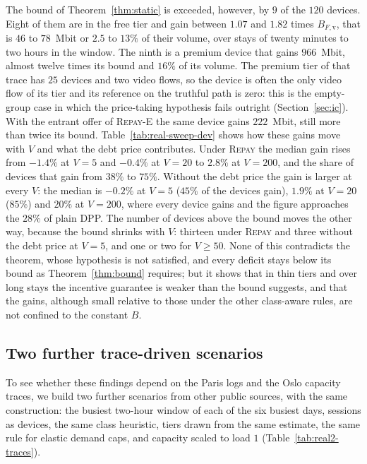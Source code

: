 \documentclass[preprint,11pt]{elsarticle}
\theoremstyle{definition}
\theoremstyle{remark}
\newcommand{\repay}{\textsc{Repay}}
\begin{document}
The bound of Theorem~\ref{thm:static} is exceeded, however, by $9$ of the $120$ devices.
Eight of them are in the free tier and gain between $1.07$ and $1.82$ times $B_{F,\mathrm{v}}$, that is $46$ to $78$~Mbit or $2.5$ to $13\%$ of their volume, over stays of twenty minutes to two hours in the window.
The ninth is a premium device that gains $966$~Mbit, almost twelve times its bound and $16\%$ of its volume.
The premium tier of that trace has $25$ devices and two video flows, so the device is often the only video flow of its tier and its reference on the truthful path is zero: this is the empty-group case in which the price-taking hypothesis fails outright (Section~\ref{sec:ic}).
With the entrant offer of \textsc{Repay-E} the same device gains $222$~Mbit, still more than twice its bound.
Table~\ref{tab:real-sweep-dev} shows how these gains move with $V$ and what the debt price contributes.
Under \repay{} the median gain rises from $-1.4\%$ at $V=5$ and $-0.4\%$ at $V=20$ to $2.8\%$ at $V=200$, and the share of devices that gain from $38\%$ to $75\%$.
Without the debt price the gain is larger at every $V$: the median is $-0.2\%$ at $V=5$ ($45\%$ of the devices gain), $1.9\%$ at $V=20$ ($85\%$) and $20\%$ at $V=200$, where every device gains and the figure approaches the $28\%$ of plain DPP.
The number of devices above the bound moves the other way, because the bound shrinks with $V$: thirteen under \repay{} and three without the debt price at $V=5$, and one or two for $V\ge50$.
None of this contradicts the theorem, whose hypothesis is not satisfied, and every deficit stays below its bound as Theorem~\ref{thm:bound} requires; but it shows that in thin tiers and over long stays the incentive guarantee is weaker than the bound suggests, and that the gains, although small relative to those under the other class-aware rules, are not confined to the constant $B$.

\subsection{Two further trace-driven scenarios}\label{sec:exp-real2}

To see whether these findings depend on the Paris logs and the Oslo capacity traces, we build two further scenarios from other public sources, with the same construction: the busiest two-hour window of each of the six busiest days, sessions as devices, the same class heuristic, tiers drawn from the same estimate, the same rule for elastic demand caps, and capacity scaled to load $1$ (Table~\ref{tab:real2-traces}).
\end{document}
